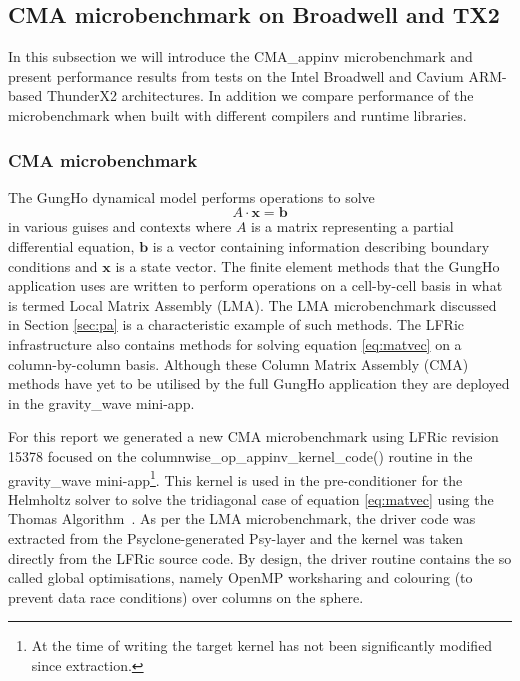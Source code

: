 \subsection{CMA microbenchmark on Broadwell and TX2}
\label{sec:pa-microbenchmark}
In this subsection we will introduce the CMA\_appinv microbenchmark and present performance results from tests on the Intel Broadwell and Cavium ARM-based ThunderX2 architectures.
In addition we compare performance of the microbenchmark when built with different compilers and runtime libraries.

\subsubsection{CMA microbenchmark}

The GungHo dynamical model performs operations to solve
\begin{equation} \label{eq:matvec}
A \cdot \mathbf{x} = \mathbf{b}
\end{equation}
in various guises and contexts where $A$ is a matrix representing a partial differential equation, $\mathbf{b}$ is a vector containing information describing boundary conditions and $\mathbf{x}$ is a state vector.
The finite element methods that the GungHo application uses are written to perform operations on a cell-by-cell basis in what is termed Local Matrix Assembly (LMA).
The LMA microbenchmark discussed in Section \ref{sec:pa} is a characteristic example of such methods.
The LFRic infrastructure also contains methods for solving equation \ref{eq:matvec} on a column-by-column basis.
Although these Column Matrix Assembly (CMA) methods have yet to be utilised by the full GungHo application they are deployed in the gravity\_wave mini-app.

For this report we generated a new CMA microbenchmark using LFRic revision 15378 focused on the columnwise\_op\_appinv\_kernel\_code() routine in the gravity\_wave mini-app\footnote{At the time of writing the target kernel has not been significantly modified since extraction.}.
This kernel is used in the pre-conditioner for the Helmholtz solver to solve the tridiagonal case of equation \ref{eq:matvec} using the Thomas Algorithm~\cite{numericalrecipes}.
As per the LMA microbenchmark, the driver code was extracted from the Psyclone-generated Psy-layer and the kernel was taken directly from the LFRic source code.
By design, the driver routine contains the so called global optimisations, namely OpenMP worksharing and colouring (to prevent data race conditions) over columns on the sphere.

